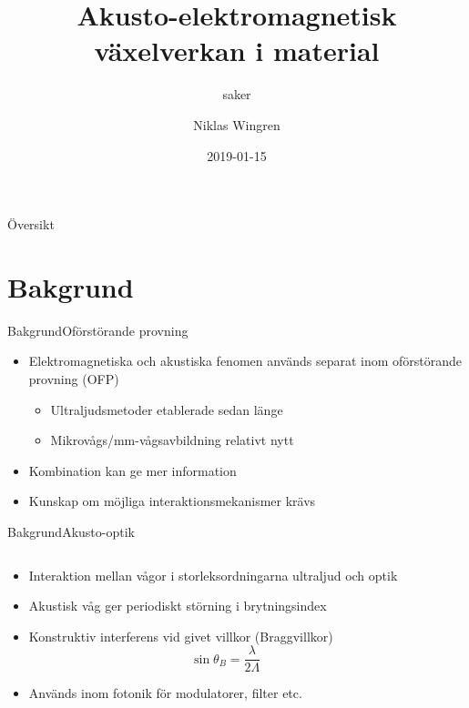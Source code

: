 \documentclass[11pt]{beamer}
\begin{document}
	\author{Niklas Wingren}
	\title[Akusto-elektromagnetisk växelverkan]{Akusto-elektromagnetisk växelverkan i material}
	\subtitle{saker}
	\date{2019-01-15}
	\frame[plain]{\maketitle}
	
	\begin{frame}{Översikt}
		\tableofcontents
	\end{frame}
	
	
	\section{Bakgrund}
	
	\begin{frame}{Bakgrund}{Oförstörande provning}
		\begin{itemize}
			\item Elektromagnetiska och akustiska fenomen används separat inom oförstörande provning (OFP)
			\begin{itemize}
				\pause
				\item Ultraljudsmetoder etablerade sedan länge
				\pause
				\item Mikrovågs/mm-vågsavbildning relativt nytt
			\end{itemize}
			\pause
			\item Kombination kan ge mer information
			\pause
			\item Kunskap om möjliga interaktionsmekanismer krävs
		\end{itemize}
	\end{frame}
	
	\begin{frame}{Bakgrund}{Akusto-optik}
		\begin{columns}
			\begin{column}{0.6\textwidth}
				\begin{itemize}
					\item<1-> Interaktion mellan vågor i storleksordningarna ultraljud och optik
					\item<2-> Akustisk våg ger periodiskt störning i brytningsindex
					\item<3-> Konstruktiv interferens vid givet villkor (Braggvillkor)
					\begin{equation*}
						\sin{\theta_B} = \frac{\lambda}{2\Lambda}
					\end{equation*}
					\item<4-> Används inom fotonik för modulatorer, filter etc.
				\end{itemize}
			\end{column}
			\begin{column}{0.4\textwidth}
				\uncover<2->{
					\resizebox{\textwidth}{!}{
						
					}
				}
			\end{column}
		\end{columns}
	\end{frame}
	
\end{document}
